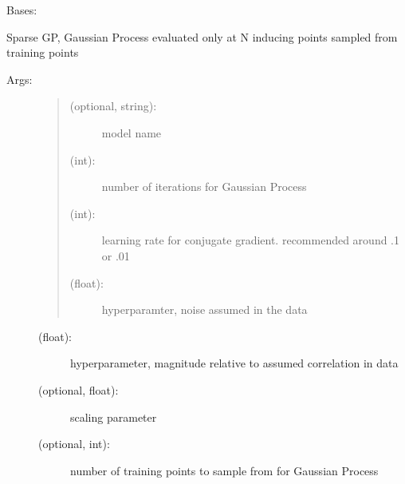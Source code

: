 \documentclass[letterpaper,10pt,english,openany,oneside]{sphinxmanual}
\begin{document}
\begin{fulllineitems}
\label{\detokenize{gp:methods.regressor.SparseGP.SparseGPRegression}}
Bases: 

Sparse GP, Gaussian Process evaluated only at N inducing points sampled from training points
\begin{description}
\item[{Args:}] \leavevmode\begin{quote}
\begin{description}
\item[{ (optional, string):}] \leavevmode
model name

\item[{ (int):}] \leavevmode
number of iterations for Gaussian Process

\item[{ (int):}] \leavevmode
learning rate for conjugate gradient. recommended around .1 or .01

\item[{ (float):}] \leavevmode
hyperparamter, noise assumed in the data

\end{description}
\end{quote}
\begin{description}
\item[{ (float):}] \leavevmode
hyperparameter, magnitude relative to assumed correlation in data

\item[{ (optional, float):}] \leavevmode
scaling parameter

\item[{ (optional, int):}] \leavevmode
number of training points to sample from for Gaussian Process

\end{description}

\end{description}

\end{fulllineitems}
\end{document}
